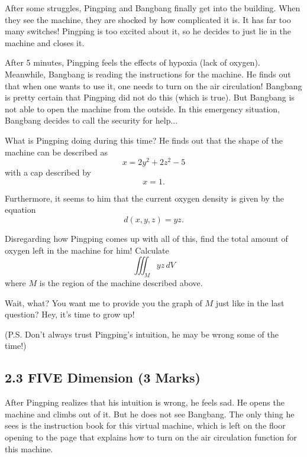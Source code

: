 \documentclass[12pt]{article}
\begin{document}
After some struggles, Pingping and Bangbang finally get into the building. When they see the machine, they are 
shocked by how complicated it is. It has far too many switches! Pingping is too excited about it, so he decides to just lie in the machine and closes it. 

After 5 minutes, Pingping feels the effects of hypoxia (lack of oxygen). Meanwhile, Bangbang is reading the 
instructions for the machine. He finds out that when one wants to use it, one needs to turn on the air 
circulation! Bangbang is pretty certain that Pingping did not do this (which is true). But Bangbang is not able to open the machine
from the outside. In this emergency situation, Bangbang decides to call the security for help...

What is Pingping doing during this time? He finds out that the  shape of the machine can be described as 
\begin{equation*}
    x = 2y^2 + 2z^2 - 5 
\end{equation*}
with a cap described by 
\begin{equation*}
    x = 1.
\end{equation*}
 
Furthermore, it seems to him that the current oxygen density is given by the equation 
\begin{equation*}
    d(x,y,z) = yz. 
\end{equation*}

Disregarding how Pingping comes up with all of this, find the total amount of oxygen left in the 
machine for him! Calculate 
\begin{equation*}
    \iiint_M yz\,dV
\end{equation*}
where $M$ is the region of the machine described above. 

Wait, what? You want me to provide you the graph of $M$ just like in the last question? Hey, it's time to grow 
up! 

\hfill (P.S. Don't always trust Pingping's intuition, he may be wrong some of the time!)


\subsection*{2.3 FIVE Dimension (3 Marks)}

After Pingping realizes that his intuition is wrong, he feels sad. He opens the machine and climbs out of it. But 
he does not see Bangbang. The only thing he sees is the instruction book for this virtual machine, which is left 
on the floor opening to the page that explains how to turn on the air circulation function for this machine. 
\end{document}
